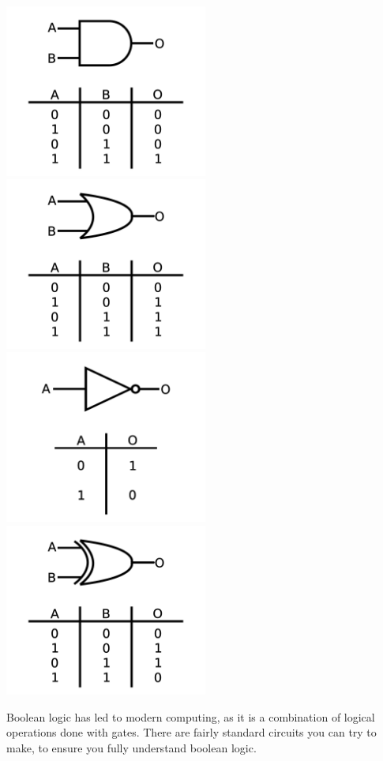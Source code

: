 \documentclass[a4paper,11pt]{report}
\begin{document}
\includegraphics[width=0.5\textwidth]{andgate1}
\includegraphics[width=0.5\textwidth]{orgate1}
\includegraphics[width=0.5\textwidth]{notgate1}
\includegraphics[width=0.5\textwidth]{xorgate1}

Boolean logic has led to modern computing, as it is a combination of logical operations done with gates. There are fairly standard circuits you can try to make, to ensure you fully understand boolean logic.
\end{document}
